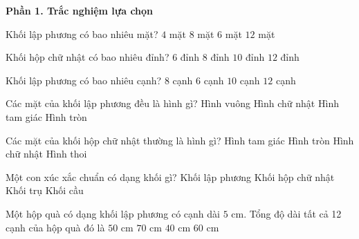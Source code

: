 \textbf{Phần 1. Trắc nghiệm lựa chọn}

\begin{ex} %
Khối lập phương có bao nhiêu mặt?
\choice
{$4$ mặt}
{$8$ mặt}
{\True $6$ mặt}
{$12$ mặt}
\end{ex}

\begin{ex} %
Khối hộp chữ nhật có bao nhiêu đỉnh?
\choice
{$6$ đỉnh}
{\True $8$ đỉnh}
{$10$ đỉnh}
{$12$ đỉnh}
\end{ex}

\begin{ex} %
Khối lập phương có bao nhiêu cạnh?
\choice
{$8$ cạnh}
{$6$ cạnh}
{$10$ cạnh}
{\True $12$ cạnh}
\end{ex}

\begin{ex} %
Các mặt của khối lập phương đều là hình gì?
\choice
{\True Hình vuông}
{Hình chữ nhật}
{Hình tam giác}
{Hình tròn}
\end{ex}

\begin{ex} %
Các mặt của khối hộp chữ nhật thường là hình gì?
\choice
{Hình tam giác}
{Hình tròn}
{\True Hình chữ nhật}
{Hình thoi}
\end{ex}

\begin{ex} %
Một con xúc xắc chuẩn có dạng khối gì?
\choice
{\True Khối lập phương}
{Khối hộp chữ nhật}
{Khối trụ}
{Khối cầu}
\end{ex}

\begin{ex} %
Một hộp quà có dạng khối lập phương có cạnh dài $5\text{ cm}$. Tổng độ dài tất cả 12 cạnh của hộp quà đó là
\choice
{$50\text{ cm}$}
{$70\text{ cm}$}
{$40\text{ cm}$}
{\True $60\text{ cm}$}
\end{ex}

